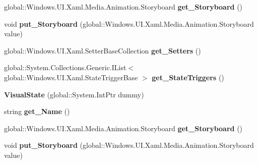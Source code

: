 \begin{DoxyCompactItemize}
\mbox{\label{class_windows_1_1_u_i_1_1_xaml_1_1_visual_state_a6b5d43fae9eab67c703b75086a08b538}} 
global\+::\+Windows.\+U\+I.\+Xaml.\+Media.\+Animation.\+Storyboard {\bfseries get\+\_\+\+Storyboard} ()
\item 
\mbox{\label{class_windows_1_1_u_i_1_1_xaml_1_1_visual_state_a3b834606f339f18853900acbdc0871b8}} 
void {\bfseries put\+\_\+\+Storyboard} (global\+::\+Windows.\+U\+I.\+Xaml.\+Media.\+Animation.\+Storyboard value)
\item 
\mbox{\label{class_windows_1_1_u_i_1_1_xaml_1_1_visual_state_ac81aee782cc1e2a4470e9847716cafa0}} 
global\+::\+Windows.\+U\+I.\+Xaml.\+Setter\+Base\+Collection {\bfseries get\+\_\+\+Setters} ()
\item 
\mbox{\label{class_windows_1_1_u_i_1_1_xaml_1_1_visual_state_a27eb2311db04fa8c2a18edac2aa49be9}} 
global\+::\+System.\+Collections.\+Generic.\+I\+List$<$ global\+::\+Windows.\+U\+I.\+Xaml.\+State\+Trigger\+Base $>$ {\bfseries get\+\_\+\+State\+Triggers} ()
\item 
\mbox{\label{class_windows_1_1_u_i_1_1_xaml_1_1_visual_state_a2c46a539387b55802a381e56d280a8ae}} 
{\bfseries Visual\+State} (global\+::\+System.\+Int\+Ptr dummy)
\item 
\mbox{\label{class_windows_1_1_u_i_1_1_xaml_1_1_visual_state_a879a468f5014b12ff6c4d57ff0f58a5b}} 
string {\bfseries get\+\_\+\+Name} ()
\item 
\mbox{\label{class_windows_1_1_u_i_1_1_xaml_1_1_visual_state_a6b5d43fae9eab67c703b75086a08b538}} 
global\+::\+Windows.\+U\+I.\+Xaml.\+Media.\+Animation.\+Storyboard {\bfseries get\+\_\+\+Storyboard} ()
\item 
\mbox{\label{class_windows_1_1_u_i_1_1_xaml_1_1_visual_state_a3b834606f339f18853900acbdc0871b8}} 
void {\bfseries put\+\_\+\+Storyboard} (global\+::\+Windows.\+U\+I.\+Xaml.\+Media.\+Animation.\+Storyboard value)

\end{DoxyCompactItemize}
